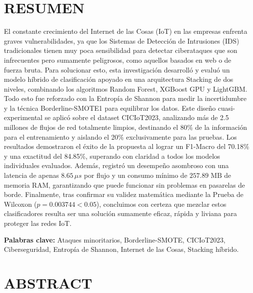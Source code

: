 \chapter*{RESUMEN}

El constante crecimiento del Internet de las Cosas (IoT) en las empresas enfrenta graves vulnerabilidades, ya que los Sistemas de Detección de Intrusiones (IDS) tradicionales tienen muy poca sensibilidad para detectar ciberataques que son infrecuentes pero sumamente peligrosos, como aquellos basados en web o de fuerza bruta. Para solucionar esto, esta investigación desarrolló y evaluó un modelo híbrido de clasificación apoyado en una arquitectura Stacking de dos niveles, combinando los algoritmos Random Forest, XGBoost GPU y LightGBM. Todo esto fue reforzado con la Entropía de Shannon para medir la incertidumbre y la técnica Borderline-SMOTE1 para equilibrar los datos. Este diseño cuasi-experimental se aplicó sobre el dataset CICIoT2023, analizando más de 2.5 millones de flujos de red totalmente limpios, destinando el 80\% de la información para el entrenamiento y aislando el 20\% exclusivamente para las pruebas. Los resultados demostraron el éxito de la propuesta al lograr un F1-Macro del 70.18\% y una exactitud del 84.85\%, superando con claridad a todos los modelos individuales evaluados. Además, registró un desempeño asombroso con una latencia de apenas $8.65\,\mu s$ por flujo y un consumo mínimo de $257.89\text{ MB}$ de memoria RAM, garantizando que puede funcionar sin problemas en pasarelas de borde. Finalmente, tras confirmar su validez matemática mediante la Prueba de Wilcoxon ($p = 0.003744 < 0.05$), concluimos con certeza que mezclar estos clasificadores resulta ser una solución sumamente eficaz, rápida y liviana para proteger las redes IoT.

\vspace{0.5cm}
\noindent \textbf{Palabras clave:} Ataques minoritarios, Borderline-SMOTE, CICIoT2023, Ciberseguridad, Entropía de Shannon, Internet de las Cosas, Stacking híbrido.

\clearpage
\chapter*{ABSTRACT}

